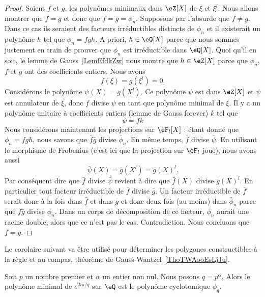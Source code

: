 \begin{proof}
	Soient \( f\) et \( g\), les polynômes minimaux dans \( \eZ[X]\) de \( \xi\) et \( \xi^l\). Nous allons montrer que \( f=g\) et donc que \( f=g=\phi_n\). Supposons par l'absurde que \( f\neq g\). Dans ce cas ils seraient des facteurs irréductibles distincts de \( \phi_n\) et il existerait un polynôme \( h\) tel que \( \phi_n=fgh\). A priori, \( h\in \eQ[X]\) parce que nous sommes justement en train de prouver que \( \phi_n\) est irréductible dans \( \eQ[X]\). Quoi qu'il en soit, le lemme de Gauss~\ref{LemEfdkZw} nous montre que \( h\in \eZ[X]\) parce que \( \phi_n\), \( f\) et \( g\) ont des coefficients entiers. Nous avons
	\begin{equation}
		f(\xi)=g(\xi^l)=0.
	\end{equation}
	Considérons le polynôme \( \psi(X)=g(X^l)\). Ce polynôme \( \psi\) est dans \( \eZ[X]\) et \( \psi\) est annulateur de \( \xi\), donc \( f\) divise \( \psi\) en tant que polynôme minimal de \( \xi\). Il y a un polynôme unitaire à coefficients entiers (lemme de Gauss forever) \( k\) tel que
	\begin{equation}
		\psi=fk
	\end{equation}
	Nous considérons maintenant les projections sur \( \eF_l[X]\) : étant donné que \( \phi_n=fgh\), nous savons que \( \bar f\bar g\) divise \( \bar\phi_n\). En même temps, \( \bar f\) divise \( \bar \psi\). En utilisant le morphisme de Frobenius (c'est ici que la projection sur \( \eF_l\) joue), nous avons aussi
	\begin{equation}
		\bar\psi(X)=\bar g(X^l)=\bar g(X)^l.
	\end{equation}
	Par conséquent dire que \( \bar f\) divise \( \bar\psi\) revient à dire que \( \bar f(X)\) divise \( \bar g(X)^l\). En particulier tout facteur irréductible de \( \bar f\) divise \( \bar g\). Un facteur irréductible de \( \bar f\) serait donc à la fois dans \( \bar f\) et dans \( \bar g\) et donc deux fois (au moins) dans \( \bar\phi_n\) parce que \( \bar f\bar g\) divise \( \phi_n\). Dans un corps de décomposition de ce facteur, \( \phi_n\) aurait une racine double, alors que ce n'est pas le cas. Contradiction. Nous concluons que \( f=g\).
\end{proof}

Le corolaire suivant va être utilisé pour déterminer les polygones constructibles à la règle et au compas, théorème de Gauss-Wantzel~\ref{ThoTWAooEsLjJu}.
\begin{corollary}   \label{CorKRTooTJtyvP}
	Soit \( p\) un nombre premier et \( \alpha\) un entier non nul. Nous posons \( q=p^{\alpha}\). Alors le polynôme minimal de \(  e^{2 i\pi/q}\) sur \( \eQ\) est le polynôme cyclotomique \( \phi_q\).
\end{corollary}

